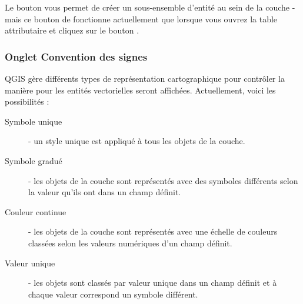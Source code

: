 Le bouton  vous permet de créer un sous-ensemble d'entité au sein de la couche - mais ce bouton de fonctionne actuellement que lorsque vous ouvrez la table attributaire et cliquez sur le bouton .

\subsubsection{Onglet Convention des signes}\label{sec:symbology}

QGIS gère différents types de représentation cartographique pour contrôler la manière pour les entités vectorielles seront affichées. Actuellement, voici les possibilités :

\begin{description}
\item[Symbole unique] - un style unique est appliqué à tous les objets de la couche.
\item[Symbole gradué] - les objets de la couche sont représentés avec des symboles différents selon la valeur qu'ils ont dans un champ définit.
\item[Couleur continue] - les objets de la couche sont représentés avec une échelle de couleurs classées selon les valeurs numériques d'un champ définit.
\item[Valeur unique] - les objets sont classés par valeur unique dans un champ définit et à chaque valeur correspond un symbole différent.
\end{description}

